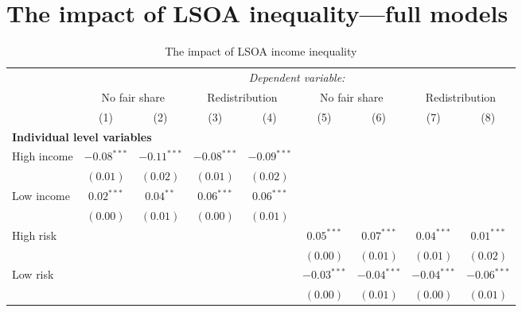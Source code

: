 \documentclass[12pt, letter]{scrartcl}
\begin{document}
\section{The impact of LSOA inequality---full models}
\label{appendix:lsoafull}

\begin{tiny}
\setlength{\tabcolsep}{0.2em}
\begin{longtable}{lcccccccc}
\caption[The impact of LSOA income inequality]{The impact of LSOA income inequality}\\
& \multicolumn{8}{c}{\textit{Dependent variable:}} \\[5pt]
& \multicolumn{2}{c}{No fair share} & \multicolumn{2}{c}{Redistribution} & \multicolumn{2}{c}{No fair share} & \multicolumn{2}{c}{Redistribution} \\
& (1) & (2) & (3) & (4) & (5) & (6) & (7) & (8) \\ 
\toprule[1pt]
\multicolumn{9}{l}{\textbf{Individual level variables}} \\[5pt]
High income                                 & $-0.08^{***}$ & $-0.11^{***}$ & $-0.08^{***}$ & $-0.09^{***}$ &               &               &               &               \\
                                            & $(0.01)$      & $(0.02)$      & $(0.01)$      & $(0.02)$      &               &               &               &               \\
Low income                                  & $0.02^{***}$  & $0.04^{**}$   & $0.06^{***}$  & $0.06^{***}$  &               &               &               &               \\
                                            & $(0.00)$      & $(0.01)$      & $(0.00)$      & $(0.01)$      &               &               &               &               \\
High risk                                   &               &               &               &               & $0.05^{***}$  & $0.07^{***}$  & $0.04^{***}$  & $0.01^{***}$  \\
                                            &               &               &               &               & $(0.00)$      & $(0.01)$      & $(0.01)$      & $(0.02)$      \\
Low risk                                    &               &               &               &               & $-0.03^{***}$ & $-0.04^{***}$ & $-0.04^{***}$ & $-0.06^{***}$ \\
                                            &               &               &               &               & $(0.00)$      & $(0.01)$      & $(0.00)$      & $(0.01)$      \\

\end{longtable}
\end{tiny}
\end{document}
